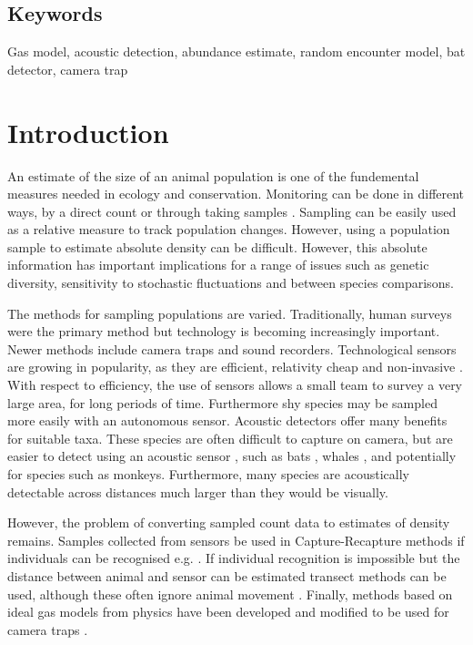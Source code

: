 \documentclass[a4paper,10pt,reqno,oneside]{amsart}
\begin{document}
\subsection{Keywords}
Gas model, acoustic detection, abundance estimate, random encounter model, bat detector, camera trap

\section{Introduction}

An estimate of the size of an animal population is one of the fundemental measures needed in ecology and conservation. Monitoring can be done in different ways, by a direct count or through taking samples \citep{pollock2002large}. Sampling can be easily used as a relative measure to track population changes. However, using a population sample to estimate absolute density can be difficult. However, this absolute information has important implications for a range of issues such as genetic diversity, sensitivity to stochastic fluctuations and between species comparisons.

The methods for sampling populations are varied. Traditionally, human surveys were the primary method but technology is becoming increasingly important. Newer methods include camera traps and sound recorders. Technological sensors are growing in popularity, as they are efficient, relativity cheap and non-invasive \citep{gese2001monitoring}. With respect to efficiency, the use of sensors allows a small team to survey a very large area, for long periods of time. Furthermore shy species may be sampled more easily with an autonomous sensor. Acoustic detectors offer many benefits for suitable taxa. These species are often difficult to capture on camera, but are easier to detect using an acoustic sensor \citep{rogers2013density}, such as bats \citep{ofarrel1999comparison}, whales \citep{mcdonald1999passive}, and potentially for species such as monkeys. Furthermore, many species are acoustically detectable across distances much larger than they would be visually. 


However, the problem of converting sampled count data to estimates of density remains. Samples collected from sensors be used in Capture-Recapture \citep{leslie1953estimation,schwarz1999} methods if individuals can be recognised e.g. \citep{karanth1995, trolle2003estimation, soisalo2006estimating, trolle2007camera}. If individual recognition is impossible but the distance between animal and sensor can be estimated transect methods can be used, although these often ignore animal movement \citep{barlow2005estimates, marques2011estimating}. Finally, methods based on ideal gas models from physics have been developed \citep{yapp1956theory, Hutchinson_Waser_2007} and modified to be used for camera traps \citep{rowcliffe2008estimating}.
\end{document}
